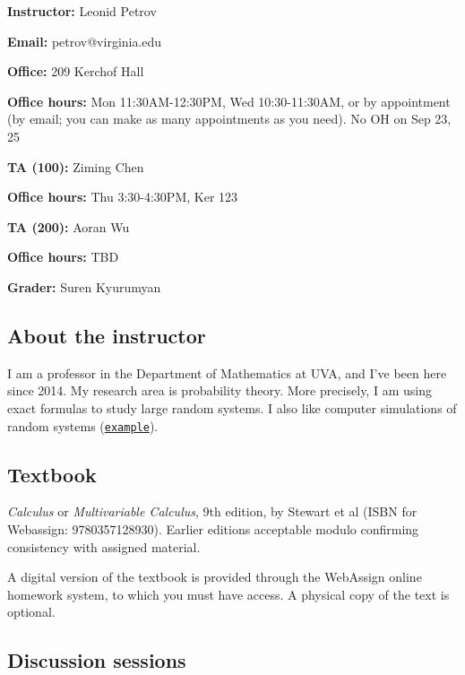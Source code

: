 \documentclass[oneside,11pt]{amsart}
\begin{document}
\parbox{.5\textwidth}{

\textbf{Instructor:} Leonid Petrov

\textbf{Email:} petrov@virginia.edu

\textbf{Office:} 209 Kerchof Hall

\textbf{Office hours:} Mon 11:30AM-12:30PM, Wed 10:30-11:30AM,
or by appointment (by email; you can make as many appointments as you need). No OH on Sep 23, 25}\hspace{30pt}
\parbox{.45\textwidth}{

\textbf{TA (100):} Ziming Chen

\textbf{Office hours:} Thu 3:30-4:30PM, Ker 123

\textbf{TA (200):} Aoran Wu

\textbf{Office hours:} TBD


\vspace{15pt}

\textbf{Grader:} Suren Kyurumyan}

\vspace{5pt}

\subsection{About the instructor}
I am a professor in the Department of Mathematics at UVA, and I've been here since 2014. My research area is probability theory. More precisely, I am using exact formulas to study large random systems. I also like computer simulations of random systems (\href{https://lpetrov.cc/simulations/2019-04-30-qvol/}{\textcolor{green!70!black}{\texttt{example}}}).

\subsection{Textbook}

\emph{Calculus} or \emph{Multivariable Calculus}, 9th edition, by Stewart et al (ISBN for Webassign: 9780357128930). Earlier editions acceptable modulo confirming consistency with assigned material.

A digital version of the textbook is provided through the WebAssign online homework system, to which you must have access. A physical copy of the text is optional. 

\subsection{Discussion sessions} 
\end{document}
